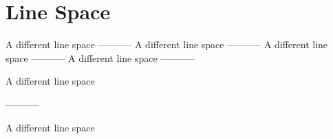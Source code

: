 \documentclass{article}
\begin{document}
    \section{Line Space}
        {
            \linespread{1.5} \selectfont
            A different\newline
            line space
        }\newline
        -----------\newline
        { A different\newline
        line space}\newline
        -----------\newline
        {\onehalfspacing A different\newline
        line space}\newline
        -----------\newline
        {\doublespacing A different\newline
        line space}\newline
        -----------\newline
        \begin{spacing}{1.5}
            A different\newline
            line space
        \end{spacing}
        -----------\newline
        \begin{doublespace}
            A different\newline
            line space
        \end{doublespace}
\end{document}

